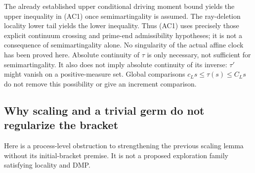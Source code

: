 \documentclass[11pt]{article}
\theoremstyle{definition}\newtheorem{definition}[theorem]{Definition}
\theoremstyle{remark}\newtheorem{remark}[theorem]{Remark}
\begin{document}
The already established upper conditional driving moment bound yields
the upper inequality in (AC1) once semimartingality is assumed.
The ray-deletion locality lower tail yields the lower inequality.
Thus (AC1) uses precisely those explicit continuum crossing and
prime-end admissibility hypotheses; it is not a consequence of
semimartingality alone. No singularity of the actual affine clock has
been proved here. Absolute continuity of $\tau$ is only necessary,
not sufficient for semimartingality. It also does not imply absolute
continuity of its inverse: $\tau'$ might vanish on a positive-measure
set. Global comparisons $c_Ls\le\tau(s)\le C_Ls$ do not remove this
possibility or give an increment comparison.

\subsection{Why scaling and a trivial germ do not regularize the bracket}
\label{sec:elliptic-selfsimilar-counterexample}

Here is a process-level obstruction to strengthening the previous
scaling lemma without its initial-bracket premise. It is not a
proposed exploration family satisfying locality and DMP.
\end{document}
